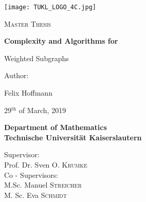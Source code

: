 \thispagestyle{empty}


\begin{titlepage}

	\begin{center}
	
		\texttt{[image: TUKL\_LOGO\_4C.jpg]}
		
		\vspace*{3.8cm}
		
		{\textsc{\LARGE Master Thesis}}
		
		\vspace*{1cm}
		
		{\huge \bfseries Complexity and Algorithms for\medskip
			
			Weighted Subgraphs}
		
		\vfill
		
		Author:\\
		
		\vspace*{0.5cm} 
		
		{\LARGE Felix Hoffmann}\\
		
		\vspace*{1cm}
		
		29$^{\text{th}}$ of March, 2019\\
		
		\vspace*{2cm}
		
		{\bfseries Department of Mathematics\\
			Technische Universität Kaiserslautern	
		}\\
		
		\vspace*{1cm}
		
		{Supervisor:\\ 
			Prof. Dr. Sven O. \textsc{Krumke}\\
			\vspace{5 mm}
			Co - Supervisors:\\
			M.Sc. Manuel \textsc{Streicher}\\ 
			M. Sc. Eva \textsc{Schmidt}
		}\\
	
	\end{center}

\end{titlepage}